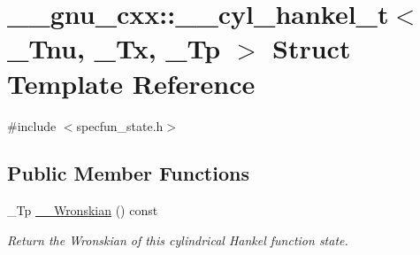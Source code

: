 \hypertarget{struct____gnu__cxx_1_1____cyl__hankel__t}{}\section{\+\_\+\+\_\+gnu\+\_\+cxx\+:\+:\+\_\+\+\_\+cyl\+\_\+hankel\+\_\+t$<$ \+\_\+\+Tnu, \+\_\+\+Tx, \+\_\+\+Tp $>$ Struct Template Reference}
\label{struct____gnu__cxx_1_1____cyl__hankel__t}


{\ttfamily \#include $<$specfun\+\_\+state.\+h$>$}

\subsection*{Public Member Functions}
\begin{DoxyCompactItemize}
\item 
\+\_\+\+Tp \hyperlink{struct____gnu__cxx_1_1____cyl__hankel__t_a8a41c4698706cb51006f2d8ebb5d8053}{\+\_\+\+\_\+\+Wronskian} () const
\begin{DoxyCompactList}\small\item\em Return the Wronskian of this cylindrical Hankel function state. \end{DoxyCompactList}\end{DoxyCompactItemize}
